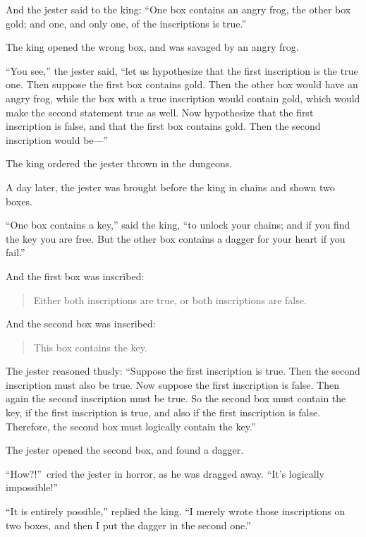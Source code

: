 {{{
 And the jester said to the king: ``One box
contains an angry frog, the other box gold; and one, and only one, of
the inscriptions is true.''}

{
 The king opened the wrong box, and was savaged by an angry frog.}

{
 ``You see,'' the jester said,
``let us hypothesize that the first inscription is the
true one. Then suppose the first box contains gold. Then the other box
would have an angry frog, while the box with a true inscription would
contain gold, which would make the second statement true as well. Now
hypothesize that the first inscription is false, and that the first box
contains gold. Then the second inscription would
be---''}

{
 The king ordered the jester thrown in the dungeons.}

{
 A day later, the jester was brought before the king in chains and
shown two boxes.}

{
 ``One box contains a key,''
said the king, ``to unlock your chains; and if you
find the key you are free. But the other box contains a dagger for your
heart if you fail.''}

{
 And the first box was inscribed:}

\begin{quote}
{
 Either both inscriptions are true, or both inscriptions are
 false.}
\end{quote}

{
 And the second box was inscribed:}

\begin{quote}
{
  This box contains the key.}
\end{quote}

{
 The jester reasoned thusly: ``Suppose the first
inscription is true. Then the second inscription must also be true. Now
suppose the first inscription is false. Then again the second
inscription must be true. So the second box must contain the key, if
the first inscription is true, and also if the first inscription is
false. Therefore, the second box must logically contain the
key.''}

{
 The jester opened the second box, and found a dagger.}

{
 ``How?!''~cried the jester in
horror, as he was dragged away. ``It's
logically impossible!''}

{
 ``It is entirely possible,''
replied the king. ``I merely wrote those inscriptions
on two boxes, and then I put the dagger in the second
one.''}

}}
